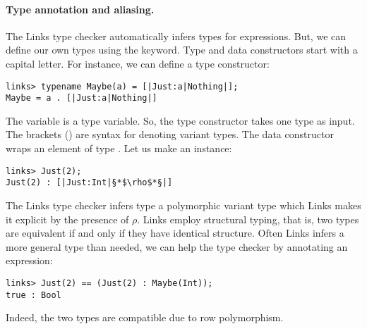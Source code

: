 \paragraph{Type annotation and aliasing.} The Links type checker automatically infers types for expressions. But, we can define our own types using the  keyword. Type and data constructors start with a capital letter. For instance, we can define a  type constructor:
\begin{lstlisting}[style=links]
links> typename Maybe(a) = [|Just:a|Nothing|];
Maybe = a . [|Just:a|Nothing|]
\end{lstlisting}
The variable  is a type variable. So, the type constructor  takes one type  as input. The brackets (\code{[|...|]}) are syntax for denoting variant types. The data constructor  wraps an element of type . Let us make an instance:
\begin{lstlisting}[style=links]
links> Just(2);
Just(2) : [|Just:Int|§*$\rho$*§|]
\end{lstlisting}
The Links type checker infers type a polymorphic variant type which Links makes it explicit by the presence of $\rho$. Links employ structural typing, that is, two types are equivalent if and only if they have identical structure. Often Links infers a more general type than needed, we can help the type checker by annotating an expression:
\begin{lstlisting}[style=links]
links> Just(2) == (Just(2) : Maybe(Int));
true : Bool
\end{lstlisting}
Indeed, the two types are compatible due to row polymorphism.

